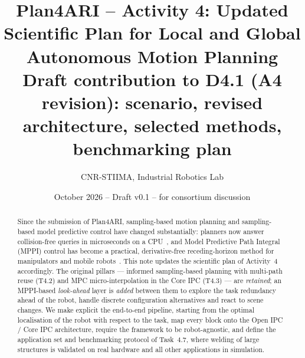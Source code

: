 \documentclass[10pt,a4paper]{article}
\title{\textbf{Plan4ARI -- Activity 4: Updated Scientific Plan for Local and Global Autonomous Motion Planning}\\[4pt]
\large Draft contribution to D4.1 (A4 revision): scenario, revised architecture, selected methods, benchmarking plan}
\author{CNR-STIIMA, Industrial Robotics Lab}
\date{October 2026 -- Draft v0.1 -- for consortium discussion}
\begin{document}
\maketitle

\begin{abstract}
\noindent
Since the submission of Plan4ARI, sampling-based motion planning and sampling-based model predictive control have changed substantially: planners now answer collision-free queries in microseconds on a CPU~\cite{thomason2024vamp}, and Model Predictive Path Integral (MPPI) control has become a practical, derivative-free receding-horizon method for manipulators and mobile robots~\cite{williams2018tro,bhardwaj2021storm,macenski2023nav2survey}. This note updates the scientific plan of Activity~4 accordingly. The original pillars --- informed sampling-based planning with multi-path reuse (T4.2) and MPC micro-interpolation in the Core IPC (T4.3) --- are \emph{retained}; an MPPI-based \emph{look-ahead} layer is \emph{added} between them to explore the task redundancy ahead of the robot, handle discrete configuration alternatives and react to scene changes. We make explicit the end-to-end pipeline, starting from the optimal localisation of the robot with respect to the task, map every block onto the Open IPC / Core IPC architecture, require the framework to be robot-agnostic, and define the application set and benchmarking protocol of Task~4.7, where welding of large structures is validated on real hardware and all other applications in simulation.
\end{abstract}

\end{document}
